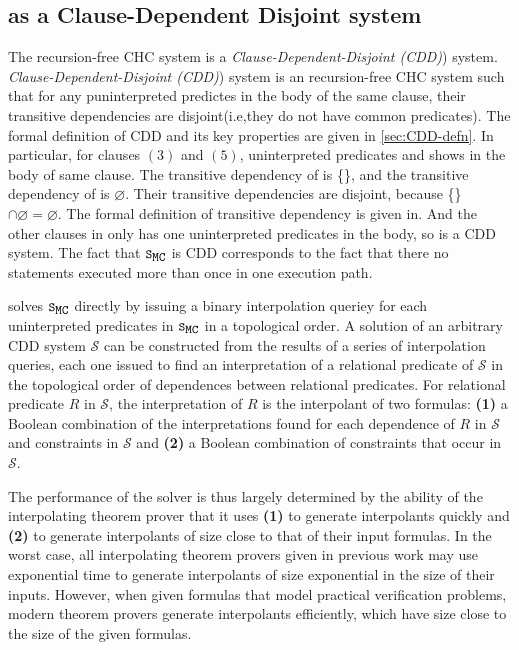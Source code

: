 \subsection{ as a Clause-Dependent Disjoint system}
\label{sec:solve-ex}
The recursion-free CHC system  is a \emph{Clause-Dependent-Disjoint (CDD)}) system.
\emph{Clause-Dependent-Disjoint (CDD)}) system is an recursion-free CHC system such that
for any puninterpreted predictes in the body of the same clause, their transitive dependencies
are disjoint(i.e,they do not have common predicates).
%
The formal definition of CDD and its key properties are given in
\autoref{sec:CDD-defn}.
In particular, for clauses $(3)$ and $(5)$, uninterpreted predicates  and  shows in
the body of same clause.
%
The transitive dependency of  is \{\}, and the transitive dependency of 
is $\varnothing$.
%
Their transitive dependencies are disjoint, because \{\} $\cap \varnothing = \varnothing$.
%
The formal definition of transitive dependency is given in.
%
And the other clauses in  only has one uninterpreted predicates in the body, so
 is a CDD system.
%
The fact that $\mcchc$ is CDD corresponds to the fact that there no statements executed more than
once in one execution path.
%

\sys solves $\mcchc$ directly by issuing a binary 
interpolation queriey for each uninterpreted predicates in $\mcchc$ in a topological order.
A solution of an arbitrary CDD system $\mathcal{S}$ can be constructed
from the results of a series of interpolation queries, each one issued
to find an interpretation of a relational predicate of $\mathcal{S}$
in the topological order of dependences between relational predicates.
%
For relational predicate $R$ in $\mathcal{S}$, the interpretation of
$R$ is the interpolant of two formulas: %
\textbf{(1)} a Boolean combination of the interpretations found for
each dependence of $R$ in $\mathcal{S}$ and constraints in
$\mathcal{S}$ and %
\textbf{(2)} a Boolean combination of constraints that occur in
$\mathcal{S}$.

The performance of the solver is thus largely determined by the
ability of the interpolating theorem prover that it uses \textbf{(1)}
to generate interpolants quickly and %
\textbf{(2)} to generate interpolants of size close to that of their
input formulas.
%
In the worst case, all interpolating theorem provers given in previous
work may use exponential time to generate interpolants of size
exponential in the size of their inputs.
%
However, when given formulas that model practical verification
problems, modern theorem provers generate interpolants efficiently,
which have size close to the size of the given formulas.


